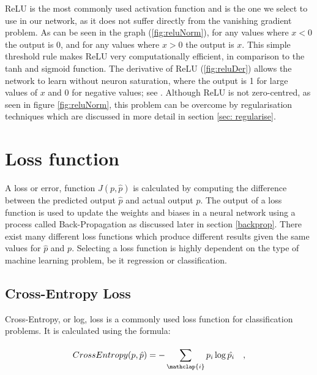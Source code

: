             ReLU is the most commonly used activation function and is the one we select to use in our network, as it does not suffer directly from the vanishing gradient problem. As can be seen in the graph (\ref{fig:reluNorm}), for any values where $x < 0$ the output is 0, and for any values where $x > 0$ the output is $x$. This simple threshold rule makes ReLU very computationally efficient, in comparison to the tanh and sigmoid function. The derivative of ReLU (\ref{fig:reluDer}) allows the network to learn without neuron saturation, where the output is 1 for large values of $x$ and 0 for negative values; see \cite{activation_funcA}. Although ReLU is not zero-centred, as seen in figure \ref{fig:reluNorm}, this problem can be overcome by regularisation techniques which are discussed in more detail in section \ref{sec: regularise}. 
            
        

        

    \section{Loss function} \label{loss_function}
        A loss or error, function $J(p, \hat{p})$ is calculated by computing the difference between the predicted output $\hat{p}$ and actual output $p$. The output of a loss function is used to update the weights and biases in a neural network using a process called Back-Propagation as discussed later in section \ref{backprop}. There exist many different loss functions which produce different results given the same values for $\hat{p}$ and $p$. Selecting a loss function is highly dependent on the type of machine learning problem, be it regression or classification.
        
        \subsection{Cross-Entropy Loss}
            Cross-Entropy, or log, loss is a commonly used loss function for classification problems. It is calculated using the formula: 
            
            \begin{equation} \label{cross_entropy_formula}
                CrossEntropy(p, \hat{p}) = -\sum_{\mathclap{i}}^{} p_i \log{\hat{p_i}} \quad,
            \end{equation}
            

